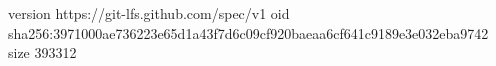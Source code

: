 version https://git-lfs.github.com/spec/v1
oid sha256:3971000ae736223e65d1a43f7d6c09cf920baeaa6cf641c9189e3e032eba9742
size 393312
